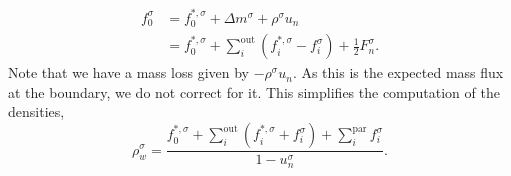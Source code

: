 \documentclass[aps,physrev,twocolumn,10pt]{revtex4-2}
\begin{document}
\begin{equation}
\begin{split}
    f_0^\sigma &= f_0^{*,\sigma} + \Delta m^\sigma + \rho^\sigma u_n\\
    &= f_0^{*,\sigma} + \sum_i^{\text{out}}\left(f_i^{*,\sigma} - f_i^\sigma\right) + \frac{1}{2}F^\sigma_n.
\end{split}
\end{equation}
Note that we have a mass loss given by $-\rho^\sigma u_n$. As this is the expected mass flux at the boundary, we do not correct for it. This simplifies the computation of the densities,
\begin{equation}
    \rho^\sigma_w = \frac{f_0^{*,\sigma} + \sum_i^\text{out}\left(f_i^{*,\sigma} + f_i^\sigma\right) + \sum_i^\text{par}f_i^\sigma}{1 - u_n^\sigma}.
\end{equation}
\end{document}
